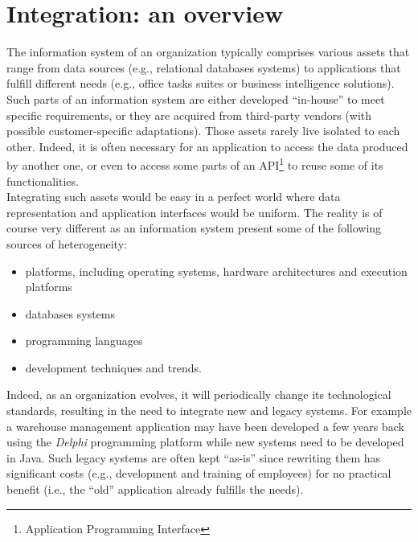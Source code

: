 
\section{Integration: an overview}


The information system of an organization typically comprises various assets that range from data sources (e.g., relational databases systems) to applications that fulfill different needs (e.g., office tasks suites or business intelligence solutions). Such parts of an information system are either developed ``in-house'' to meet specific requirements, or they are acquired from third-party vendors (with possible customer-specific adaptations). Those assets rarely live isolated to each other. Indeed, it is often necessary for an application to access the data produced by another one, or even to access some parts of an API\footnote{Application Programming Interface} to reuse some of its functionalities.\\

Integrating such assets would be easy in a perfect world where data representation and application interfaces would be uniform. The reality is of course very different as an information system present some of the following sources of heterogeneity:
\begin{itemize}

	\item platforms, including operating systems, hardware architectures and execution platforms
	
	\item databases systems
	
	\item programming languages
	
	\item development techniques and trends.

\end{itemize}
Indeed, as an organization evolves, it will periodically change its technological standards, resulting in the need to  integrate new and legacy systems. For example a warehouse management application may have been developed a few years back using the \emph{Delphi} programming platform while new systems need to be developed in Java. Such legacy systems are often kept ``as-is'' since rewriting them has significant costs (e.g., development and training of employees) for no practical benefit (i.e., the ``old'' application already fulfills the needs). \\

